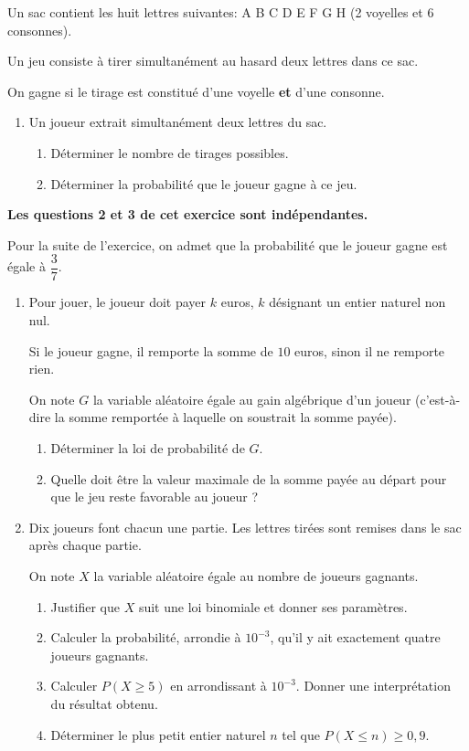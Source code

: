 \medskip

Un sac contient les huit lettres suivantes: A B C D E F G H (2 voyelles et 6 consonnes).

Un jeu consiste à tirer simultanément au hasard deux lettres dans ce sac. 

On gagne si le tirage est constitué d'une voyelle \textbf{et} d'une consonne.

\medskip

\begin{enumerate}
\item Un joueur extrait simultanément deux lettres du sac.
	\begin{enumerate}
		\item Déterminer le nombre de tirages possibles.
		\item Déterminer la probabilité que le joueur gagne à ce jeu.
	\end{enumerate}
\end{enumerate}

\medskip
	
\textbf{Les questions 2 et 3 de cet exercice sont indépendantes.}

\medskip

Pour la suite de l'exercice, on admet que la probabilité que le joueur gagne est égale à $\dfrac{3}{7}$.

\begin{enumerate}[resume]
\item Pour jouer, le joueur doit payer $k$ euros, $k$ désignant un entier naturel non nul. 

Si le joueur gagne, il remporte la somme de $10$ euros, sinon il ne remporte rien.

On note $G$ la variable aléatoire égale au gain algébrique d'un joueur (c'est-à-dire la somme remportée à laquelle on soustrait la somme payée).
	\begin{enumerate}
		\item Déterminer la loi de probabilité de $G$.
		\item Quelle doit être la valeur maximale de la somme payée au départ pour que le jeu reste
favorable au joueur ?	
	\end{enumerate}
\item Dix joueurs font chacun une partie. Les lettres tirées sont remises dans le sac après chaque partie.

On note $X$ la variable aléatoire égale au nombre de joueurs gagnants.
	\begin{enumerate}
		\item Justifier que $X$ suit une loi binomiale et donner ses paramètres.
		\item Calculer la probabilité, arrondie à $10^{-3}$, qu'il y ait exactement quatre joueurs gagnants. 
		\item Calculer $P(X \geqslant 5)$ en arrondissant à $10^{-3}$. Donner une interprétation du résultat obtenu. 
		\item Déterminer le plus petit entier naturel $n$ tel que $P(X \leqslant n) \geqslant 0,9$.
	\end{enumerate}
\end{enumerate}

\bigskip
